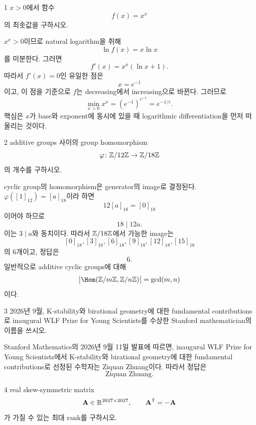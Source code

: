 
\begin{problem}{1}
$x>0$에서 함수
\[
    f(x)=x^x
\]
의 최솟값을 구하시오.
\end{problem}

\begin{solution}
$x^x>0$이므로 natural logarithm을 취해
\[
    \ln f(x)=x\ln x
\]
를 미분한다. 그러면
\[
    f'(x)=x^x(\ln x+1).
\]
따라서 $f'(x)=0$인 유일한 점은
\[
    x=e^{-1}
\]
이고, 이 점을 기준으로 $f$는 decreasing에서 increasing으로 바뀐다. 그러므로
\[
    \min_{x>0}x^x
    =\left(e^{-1}\right)^{e^{-1}}
    =\boxed{e^{-1/e}}.
\]
핵심은 $x$가 base와 exponent에 동시에 있을 때 logarithmic differentiation을 먼저 떠올리는 것이다.
\end{solution}

\begin{problem}{2}
additive groups 사이의 group homomorphism
\[
    \varphi\colon \mathbb{Z}/12\mathbb{Z}\to\mathbb{Z}/18\mathbb{Z}
\]
의 개수를 구하시오.
\end{problem}

\begin{solution}
cyclic group의 homomorphism은 generator의 image로 결정된다.
$\varphi([1]_{12})=[a]_{18}$이라 하면
\[
    12[a]_{18}=[0]_{18}
\]
이어야 하므로
\[
    18\mid12a.
\]
이는 $3\mid a$와 동치이다. 따라서 $\mathbb{Z}/18\mathbb{Z}$에서 가능한 image는
\[
    [0]_{18},[3]_{18},[6]_{18},[9]_{18},[12]_{18},[15]_{18}
\]
의 $6$개이고, 정답은
\[
    \boxed{6}.
\]
일반적으로 additive cyclic groups에 대해
\[
    \bigl|\Hom(\Z/m\Z,\Z/n\Z)\bigr|=\gcd(m,n)
\]
이다.
\end{solution}

\begin{problem}{3}
2026년 9월, K-stability와 birational geometry에 대한 fundamental contributions로 inaugural WLF Prize for Young Scientists를 수상한 Stanford mathematician의 이름을 쓰시오.
\end{problem}

\begin{solution}
Stanford Mathematics의 2026년 9월 11일 발표에 따르면, inaugural WLF Prize for Young Scientists에서 K-stability와 birational geometry에 대한 fundamental contributions로 선정된 수학자는 Ziquan Zhuang이다. 따라서 정답은
\[
    \boxed{\text{Ziquan Zhuang}}.
\]
\end{solution}

\begin{problem}{4}
real skew-symmetric matrix
\[
    \mathbf{A}\in\mathbb{R}^{2027\times2027},
    \qquad
    \mathbf{A}^{\mathsf T}=-\mathbf{A}
\]
가 가질 수 있는 최대 rank를 구하시오.
\end{problem}

